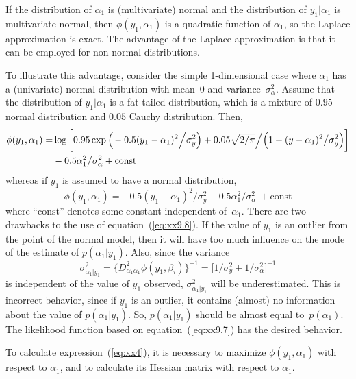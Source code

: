 If the distribution of $\alpha_1$ is (multivariate) normal and
the distribution of $y_1|\alpha_1$ is multivariate normal,
then $\phi(y_1,\alpha_1)$ is a quadratic function of $\alpha_1$, so
the Laplace approximation is exact. The advantage of the
Laplace approximation is that it can be employed for non-normal distributions.

To illustrate this advantage, consider the simple 1-dimensional case where
$\alpha_1$ has a (univariate) normal distribution with mean~0 and
variance~$\sigma_\alpha^2$.
Assume that the distribution of $y_1|\alpha_1$ is a fat-tailed
distribution, which is a mixture of $0.95$  normal distribution and $0.05$ Cauchy
distribution. Then,
\begin{align}
\nonumber \phi(y_1,\alpha_1)=& \log \bigg[ 0.95\exp \Big(\kern-.1em -0.5 (y_1-\alpha_1)^2  \Big/  \sigma_y^2 \Big)
     + 0.05\sqrt{2/\pi} \Big/ \Big(1+ (y-\alpha_1)^2 \big/ \sigma_y^2 \Big) \bigg] \\
   & -0.5\alpha_1^2 \big/ \sigma_\alpha^2 + \textrm{const}
   \label{eq:xx9.7}
\end{align}
whereas if $y_1$ is assumed to have a normal distribution,
\begin{equation}
  \phi(y_1,\alpha_1)=-0.5(y_1-\alpha_1)^2 \big/  \sigma_y^2
    -0.5\alpha_1^2 \big/ \sigma_\alpha^2\ + \textrm{const}
    \label{eq:xx9.8}
\end{equation}
where ``$\textrm{const}$'' denotes some constant independent of~$\alpha_1$.
There are two drawbacks to the use of equation~(\ref{eq:xx9.8}). %
If the value of $y_1$ is an outlier from the point of the normal
model, then it will have too much influence on the mode of the estimate of
$p(\alpha_1 | y_1)$.  Also, since the variance %
\begin{equation}
  \sigma_{\alpha_1|y_1}^2=\big\{D^2_{\alpha_1\alpha_1}\phi(y_1,\beta_i)\big\}^{-1}=\Big[1/\sigma_y^2 + 1/\sigma_\alpha^2\Big]^{-1}
\end{equation}
is independent of the value of $y_1$ observed, 
$\sigma_{\alpha_1|y_1}^2$ will be underestimated.  This is incorrect behavior,
since if $y_1$ is an outlier, it contains (almost) no information
about the value of $p(\alpha_1|y_1)$.  So, 
$p(\alpha_1|y_1)$ should be almost equal to~$p(\alpha_1)$.
The likelihood function based on equation~(\ref{eq:xx9.7}) %
has the desired behavior.

To calculate expression~(\ref{eq:xx4}), it is necessary to maximize $\phi(y_1,\alpha_1)$ with respect to $\alpha_1$,
and to calculate its Hessian matrix with respect to $\alpha_1$.

